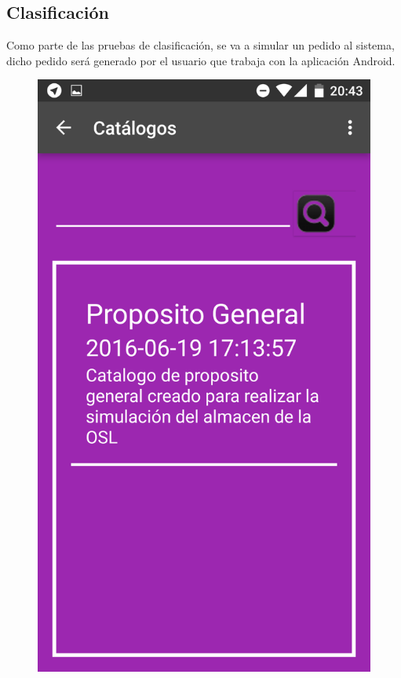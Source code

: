 \documentclass[a4paper,11pt]{book}
\begin{document}
\subsection{Clasificación}

Como parte de las pruebas de clasificación, se va a simular un pedido al sistema, dicho pedido será generado por el usuario que trabaja con la aplicación Android. 

\begin{figure}[H]
  \includegraphics[width=\linewidth]{imagenes/pruebas/movil/movil9.png}

\end{figure}
\end{document}
